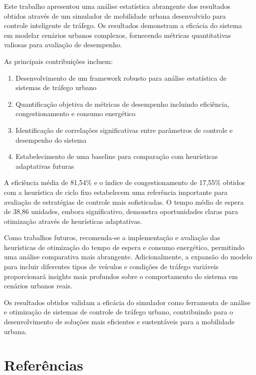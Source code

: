 \documentclass[12pt,a4paper]{article}
\begin{document}
Este trabalho apresentou uma análise estatística abrangente dos resultados obtidos através de um simulador de mobilidade urbana desenvolvido para controle inteligente de tráfego. Os resultados demonstram a eficácia do sistema em modelar cenários urbanos complexos, fornecendo métricas quantitativas valiosas para avaliação de desempenho.

As principais contribuições incluem:

\begin{enumerate}
    \item Desenvolvimento de um framework robusto para análise estatística de sistemas de tráfego urbano
    \item Quantificação objetiva de métricas de desempenho incluindo eficiência, congestionamento e consumo energético
    \item Identificação de correlações significativas entre parâmetros de controle e desempenho do sistema
    \item Estabelecimento de uma baseline para comparação com heurísticas adaptativas futuras
\end{enumerate}

A eficiência média de 81,54\% e o índice de congestionamento de 17,55\% obtidos com a heurística de ciclo fixo estabelecem uma referência importante para avaliação de estratégias de controle mais sofisticadas. O tempo médio de espera de 38,86 unidades, embora significativo, demonstra oportunidades claras para otimização através de heurísticas adaptativas.

Como trabalhos futuros, recomenda-se a implementação e avaliação das heurísticas de otimização do tempo de espera e consumo energético, permitindo uma análise comparativa mais abrangente. Adicionalmente, a expansão do modelo para incluir diferentes tipos de veículos e condições de tráfego variáveis proporcionará insights mais profundos sobre o comportamento do sistema em cenários urbanos reais.

Os resultados obtidos validam a eficácia do simulador como ferramenta de análise e otimização de sistemas de controle de tráfego urbano, contribuindo para o desenvolvimento de soluções mais eficientes e sustentáveis para a mobilidade urbana.

\section*{Referências}
\end{document}
